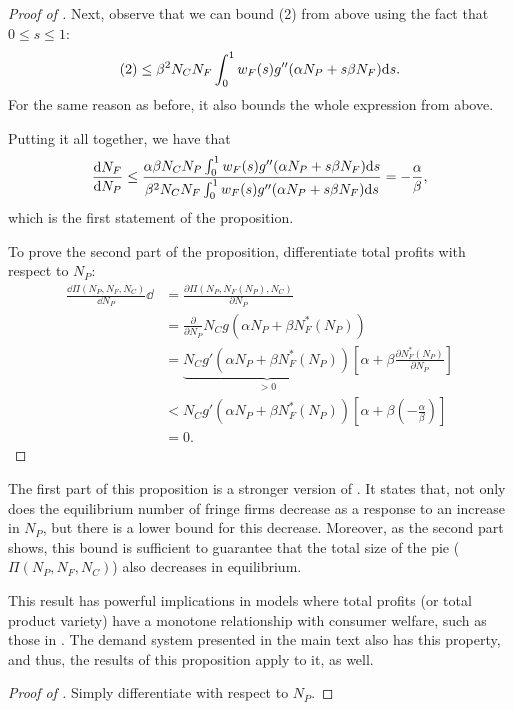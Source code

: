 \begin{proof}[Proof of ]
    Next, observe that we can bound (2) from above using the fact that $0 \leq s \leq 1$:
    \begin{align*}
        (2) \leq \beta^2 N_C N_F \int_0^1 w_F(s) g''(\alpha N_P + s \beta N_F) \mathrm{d}s.
    \end{align*}
    For the same reason as before, it also bounds the whole expression from above.

    Putting it all together, we have that
    \begin{align*}
        \frac{\mathrm{d} N_F}{\mathrm{d} N_P} \leq \frac{\alpha \beta N_C N_P \int_0^1 w_F(s) g''(\alpha N_P + s \beta N_F) \mathrm{d}s}{\beta^2 N_C N_F \int_0^1 w_F(s) g''(\alpha N_P + s \beta N_F) \mathrm{d}s} = -\frac{\alpha}{\beta},
    \end{align*}
    which is the first statement of the proposition.

    To prove the second part of the proposition, differentiate total profits with respect to $N_P$:
    \begin{align*}
        \frac{\dd \Pi(N_P, N_F, N_C)}{\dd N_P}{\dd} &= \frac{\partial \Pi(N_P, N_F(N_P), N_C)}{\partial N_P} \\
         &= \frac{\partial}{\partial N_P} N_C g(\alpha N_P + \beta N_F^*(N_P)) \\
        &= \underbrace{N_C g'(\alpha N_P + \beta N_F^*(N_P))}_{> 0} \left[ \alpha + \beta \frac{\partial N_F^*(N_P)}{\partial N_P} \right] \\
        &< N_C g'(\alpha N_P + \beta N_F^*(N_P)) \left[ \alpha + \beta \left( -\frac{\alpha}{\beta} \right) \right] \\
        &= 0.
    \end{align*}
\end{proof}

The first part of this proposition is a stronger version of .
It states that, not only does the equilibrium number of fringe firms decrease as a response to an increase in $N_P$, but there is a lower bound for this decrease.
Moreover, as the second part shows, this bound is sufficient to guarantee that the total size of the pie ($\Pi(N_P, N_F, N_C)$) also decreases in equilibrium.

This result has powerful implications in models where total profits (or total product variety) have a monotone relationship with consumer welfare, such as those in \textcite{anderson2020aggregative}.
The demand system presented in the main text also has this property, and thus, the results of this proposition apply to it, as well.
\begin{proof}[Proof of ]
    Simply differentiate  with respect to $N_P$.
\end{proof}

